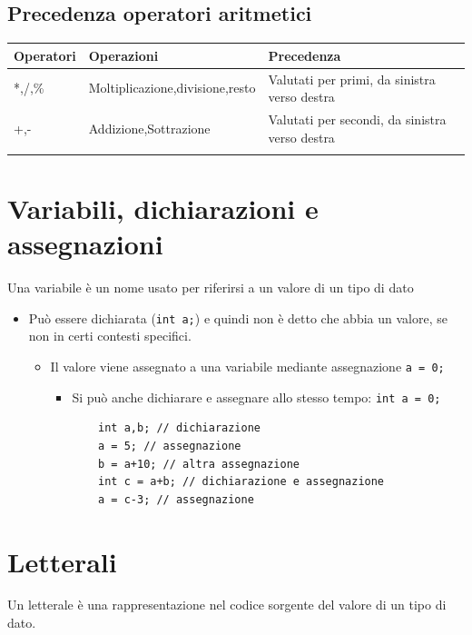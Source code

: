 \documentclass[11pt]{article}
\begin{document}
\subsection{Precedenza operatori aritmetici}
\label{sec:orgdbf817d}
\begin{center}
\begin{tabular}{lll}
Operatori & Operazioni & Precedenza\\
\hline
*,/,\% & Moltiplicazione,divisione,resto & Valutati per primi, da sinistra verso destra\\
+,- & Addizione,Sottrazione & Valutati per secondi, da sinistra verso destra\\
\hline
 &  & \\
\end{tabular}
\end{center}
\section{Variabili, dichiarazioni e assegnazioni}
\label{sec:org3686f22}
Una variabile è un nome usato per riferirsi a un valore di un tipo di dato
\begin{itemize}
\item Può essere dichiarata (\texttt{int a;}) e quindi non è detto che abbia un valore, se non in certi contesti specifici.
\begin{itemize}
\item Il valore viene assegnato a una variabile mediante assegnazione \texttt{a = 0;}
\begin{itemize}
\item Si può anche dichiarare e assegnare allo stesso tempo: \texttt{int a = 0;}

\begin{verbatim}
    int a,b; // dichiarazione
    a = 5; // assegnazione
    b = a+10; // altra assegnazione
    int c = a+b; // dichiarazione e assegnazione
    a = c-3; // assegnazione
\end{verbatim}
\end{itemize}
\end{itemize}
\end{itemize}
\section{Letterali}
\label{sec:org57f578f}

Un letterale è una rappresentazione nel codice sorgente del valore di un tipo di dato.
\end{document}
